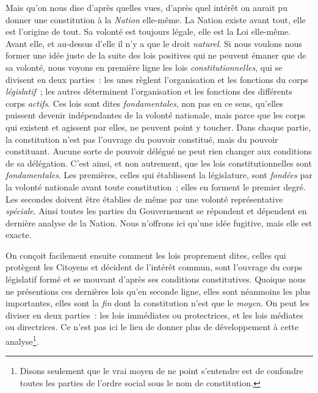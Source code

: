 \documentclass[french,twoside]{book} %
\begin{document}
Mais qu’on nous dise d’après quelles vues, d’après quel intérêt on aurait pu donner une constitution à la {\itshape Nation} elle-même. La Nation existe avant tout, elle est l’origine de tout. Sa volonté est toujours légale, elle est la Loi elle-même. Avant elle, et au-dessus d’elle il n’y a que le droit {\itshape naturel}. Si nous voulons nous former une idée juste de la suite des lois positives qui ne peuvent émaner que de sa volonté, nous voyons en première ligne les lois {\itshape constitutionnelles}, qui se divisent en deux parties : les unes règlent l’organisation et les fonctions du corps {\itshape législatif} ; les autres déterminent l’organisation et les fonctions des différents corps {\itshape actifs}. Ces lois sont dites {\itshape fondamentales}, non pas en ce sens, qu’elles puissent devenir indépendantes de la volonté nationale, mais parce que les corps qui existent et agissent par elles, ne peuvent point y toucher. Dans chaque partie, la constitution n’est pas l’ouvrage du pouvoir constitué, mais du pouvoir constituant. Aucune sorte de pouvoir délégué ne peut rien changer aux conditions de sa délégation. C’est ainsi, et non autrement, que les lois constitutionnelles sont {\itshape fondamentales}. Les premières, celles qui établissent la législature, sont {\itshape fondées} par la volonté nationale avant toute constitution ; elles en forment le premier degré. Les secondes doivent être établies de même par une volonté représentative {\itshape spéciale}. Ainsi toutes les parties du Gouvernement se répondent et dépendent en dernière analyse de la Nation. Nous n’offrons ici qu’une idée fugitive, mais elle est exacte.\par
On conçoit facilement ensuite comment les lois proprement dites, celles qui protègent les Citoyens et décident de l’intérêt commun, sont l’ouvrage du corps législatif formé et se mouvant d’après ses conditions constitutives. Quoique nous ne présentions ces dernières lois qu’en seconde ligne, elles sont néanmoins les plus importantes, elles sont la {\itshape fin} dont la constitution n’est que le {\itshape moyen}. On peut les diviser en deux parties : les lois immédiates ou protectrices, et les lois médiates ou directrices. Ce n’est pas ici le lieu de donner plus de développement à cette analyse\footnote{Disons seulement que le vrai moyen de ne point s’entendre est de confondre toutes les parties de l’ordre social sous le nom de constitution.}.\par
\end{document}
